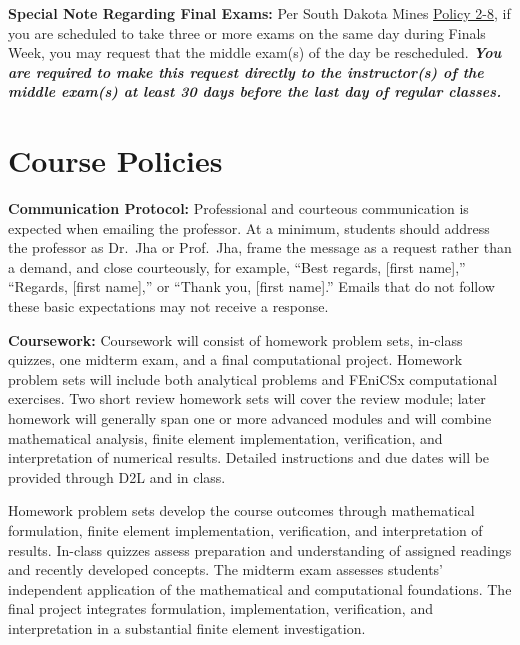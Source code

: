 \documentclass[12pt]{article}
\newcommand{\coursefield}[2]{%
  \vspace{0.2em}\noindent\textbf{#1} #2\par
}
\begin{document}
\coursefield{Special Note Regarding Final Exams:}{Per South Dakota Mines \href{https://www.sdsmt.edu/about/assets/pdf-files/policy-manual/Policy\%202-8\%20Final\%20Examination.pdf}{Policy 2-8}, if you are scheduled to take three or more exams on the same day during Finals Week, you may request that the middle exam(s) of the day be rescheduled. \textbf{\textit{You are required to make this request directly to the instructor(s) of the middle exam(s) at least 30 days before the last day of regular classes.}}
}

\section{Course Policies}

\coursefield{Communication Protocol:}
{Professional and courteous communication is expected when emailing the professor. At a minimum, students should address the professor as Dr.~Jha or Prof.~Jha, frame the message as a request rather than a demand, and close courteously, for example, ``Best regards, [first name],'' ``Regards, [first name],'' or ``Thank you, [first name].'' Emails that do not follow these basic expectations may not receive a response.}

\coursefield{Coursework:}{Coursework will consist of homework problem sets, in-class quizzes, one midterm exam, and a final computational project. Homework problem sets will include both analytical problems and FEniCSx computational exercises. Two short review homework sets will cover the review module; later homework will generally span one or more advanced modules and will combine mathematical analysis, finite element implementation, verification, and interpretation of numerical results. Detailed instructions and due dates will be provided through D2L and in class.}

Homework problem sets develop the course outcomes through mathematical formulation, finite element implementation, verification, and interpretation of results. In-class quizzes assess preparation and understanding of assigned readings and recently developed concepts. The midterm exam assesses students' independent application of the mathematical and computational foundations. The final project integrates formulation, implementation, verification, and interpretation in a substantial finite element investigation.
\end{document}

